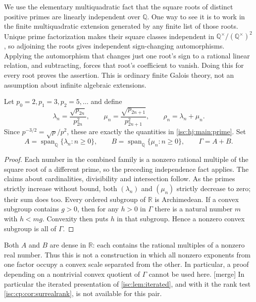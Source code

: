 \documentclass[11pt,letterpaper]{article}
\newtheorem{lemma}[theorem]{Lemma}
\theoremstyle{definition}
\theoremstyle{remark}
\newcommand{\R}{\mathbb R}
\newcommand{\Q}{\mathbb Q}
\newcommand{\Span}{\operatorname{span}_{\Q}}
\newcommand{\mtag}{\textup{[merge]}}%
\numberwithin{equation}{section}
\begin{document}
We use the elementary multiquadratic fact that the square roots of
distinct positive primes are linearly independent over $\Q$. One way
to see it is to work in the finite multiquadratic extension generated by
any finite list of those roots. Unique prime factorization makes their
square classes independent in $\Q^\times/(\Q^\times)^2$, so adjoining
the roots gives independent sign-changing automorphisms. Applying the
automorphism that changes just one root's sign to a rational linear
relation, and subtracting, forces that root's coefficient to vanish.
Doing this for every root proves the assertion. This is ordinary
finite Galois theory, not an assumption about infinite algebraic
extensions.

Let $p_0=2,p_1=3,p_2=5,\ldots$ and define
\begin{equation}\label{isc:hj:eq:realexponents}
 \lambda_n=\frac{\sqrt{p_{2n}}}{p_{2n}^{2}},\qquad
 \mu_n=\frac{\sqrt{p_{2n+1}}}{p_{2n+1}^{2}},\qquad
 \rho_n=\lambda_n+\mu_n.
\end{equation}
Since $p^{-3/2}=\sqrt p/p^2$, these are exactly the quantities in
\cref{isc:hj:main:prime}. Set
\[
 A=\Span\{\lambda_n:n\geq0\},\qquad
 B=\Span\{\mu_n:n\geq0\},\qquad \Gamma=A+B.
\]

\begin{proof}
Each number in the combined family is a nonzero rational multiple of
the square root of a different prime, so the preceding independence
fact applies. The claims about cardinalities, divisibility and
intersection follow.
As the primes strictly increase without bound, both $(\lambda_n)$ and
$(\mu_n)$ strictly decrease to zero; their sum does too.
Every ordered subgroup of $\R$ is Archimedean. If a convex subgroup
contains $g>0$, then for any $h>0$ in $\Gamma$ there is a natural number
$m$ with $h<mg$. Convexity then puts $h$ in that subgroup. Hence a
nonzero convex subgroup is all of $\Gamma$.
\end{proof}

Both $A$ and $B$ are dense in $\R$: each contains the rational multiples
of a nonzero real number. Thus this is not a construction in which all
nonzero exponents from one factor occupy a convex scale separated from
the other. In particular, a proof depending on a nontrivial convex
quotient of $\Gamma$ cannot be used here.
\mtag{} In particular the iterated presentation of \cref{isc:lem:iterated},
and with it the rank test \cref{isc:cp:cor:surrealrank}, is not available for
this pair.
\end{document}
